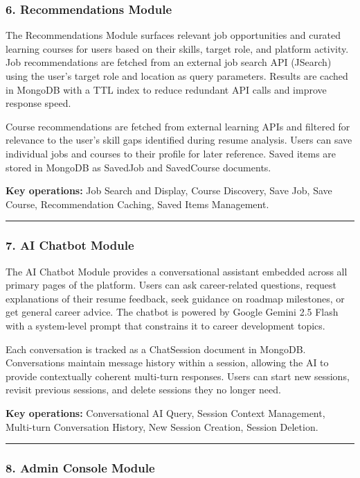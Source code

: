 \documentclass[12pt]{article}
\begin{document}
\subsubsection{6. Recommendations Module}

The Recommendations Module surfaces relevant job opportunities and curated learning courses for users based on their skills, target role, and platform activity. Job recommendations are fetched from an external job search API (JSearch) using the user's target role and location as query parameters. Results are cached in MongoDB with a TTL index to reduce redundant API calls and improve response speed.

Course recommendations are fetched from external learning APIs and filtered for relevance to the user's skill gaps identified during resume analysis. Users can save individual jobs and courses to their profile for later reference. Saved items are stored in MongoDB as SavedJob and SavedCourse documents.

\textbf{Key operations:} Job Search and Display, Course Discovery, Save Job, Save Course, Recommendation Caching, Saved Items Management.

\noindent\rule{\textwidth}{0.4pt}

\subsubsection{7. AI Chatbot Module}

The AI Chatbot Module provides a conversational assistant embedded across all primary pages of the platform. Users can ask career-related questions, request explanations of their resume feedback, seek guidance on roadmap milestones, or get general career advice. The chatbot is powered by Google Gemini 2.5 Flash with a system-level prompt that constrains it to career development topics.

Each conversation is tracked as a ChatSession document in MongoDB. Conversations maintain message history within a session, allowing the AI to provide contextually coherent multi-turn responses. Users can start new sessions, revisit previous sessions, and delete sessions they no longer need.

\textbf{Key operations:} Conversational AI Query, Session Context Management, Multi-turn Conversation History, New Session Creation, Session Deletion.

\noindent\rule{\textwidth}{0.4pt}

\subsubsection{8. Admin Console Module}
\end{document}
